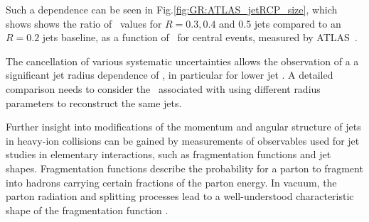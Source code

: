 Such a dependence can be seen in Fig.\ref{fig:GR:ATLAS_jetRCP_size}, which shows
shows the ratio of \Rcp\ values for $R = 0.3, 0.4$ and 0.5 jets compared
to an $R = 0.2$ jets baseline, as a function of \pT\ for central events,
measured by ATLAS~\cite{Aad:2012is}.

The cancellation of various systematic uncertainties allows the observation of a
a significant jet radius dependence of \Rcp, in particular for
lower jet \pT. A detailed comparison needs to consider the \pT\ associated with
using different radius parameters to reconstruct the same jets.

Further insight into modifications of the momentum and angular structure
of jets in heavy-ion collisions can be gained by measurements of
observables used for jet studies in elementary interactions, such as
fragmentation functions and jet shapes.
Fragmentation functions describe the probability for a parton to fragment into
hadrons carrying certain fractions of the parton energy.
In vacuum, the parton radiation and splitting processes lead to a
well-understood characteristic shape of the fragmentation function \cite{Dokshitzer:1991wu}.

